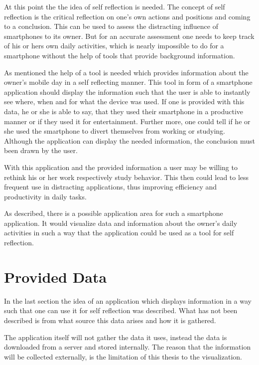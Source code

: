 At this point the the idea of self reflection is needed. The concept of self reflection is the critical reflection on one's own actions and positions and coming to a conclusion. This can be used to assess the distracting influence of smartphones to its owner. But for an accurate assessment one needs to keep track of his or hers own daily activities, which is nearly impossible to do for a smartphone without the help of tools that provide background information.

As  mentioned the help of a tool is needed which provides information about the owner's mobile day in a self reflecting manner. This tool in form of a smartphone application should display the information such that the user is able to instantly see where, when and for what the device was used. If one is provided with this data, he or she is able to say, that they used their smartphone in a productive manner or if they used it for entertainment. Further more, one could tell if he or she used the smartphone to divert themselves from working or studying. Although the application can display the needed information, the conclusion must been drawn by the user.

With  this application and the provided information a user may be willing to rethink his or her work respectively study behavior. This then could lead to less frequent use in distracting applications, thus improving efficiency and productivity in daily tasks.

As described, there is a possible application area for such a smartphone application. It would visualize data and information about the owner's daily activities in such a way that the application could be used as a tool for self reflection.

\newpage
\section{Provided Data}
In the last section the idea of an application which displays information in a way such that one can use it for self reflection was described. What has not been described is from what source this data arises and how it is gathered.

The application itself will not gather the data it uses, instead the data is downloaded from a server and stored internally. The reason that the information will be collected externally, is the limitation of this thesis to the visualization.

